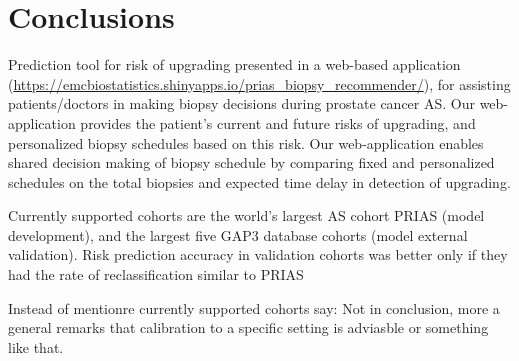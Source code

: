 \section{Conclusions}
Prediction tool for risk of upgrading presented in a web-based application (\url{https://emcbiostatistics.shinyapps.io/prias_biopsy_recommender/}), for assisting patients/doctors in making biopsy decisions during prostate cancer AS. Our web-application provides the patient's current and future risks of upgrading, and personalized biopsy schedules based on this risk. Our web-application enables shared decision making of biopsy schedule by comparing fixed and personalized schedules on the total biopsies and expected time delay in detection of upgrading.

Currently supported cohorts are the world’s largest AS cohort PRIAS (model development), and the largest five GAP3 database cohorts (model external validation). Risk prediction accuracy in validation cohorts was better only if they had the rate of reclassification similar to PRIAS

Instead of mentionre currently supported cohorts say:
Not in conclusion, more a general remarks that calibration to a specific setting is adviasble or something like that. 